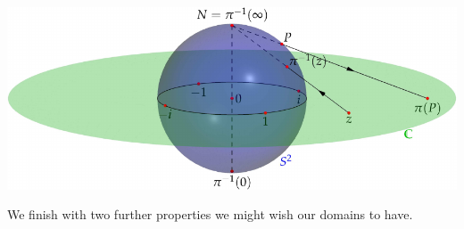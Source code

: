 \begin{center}
\href{https://www.math.uci.edu/~ndonalds/math147/complex-stereo.html}{\includegraphics[scale=0.85]{complex-stereo+0_0}}
\end{center}

 

We finish with two further properties we might wish our domains to have.

